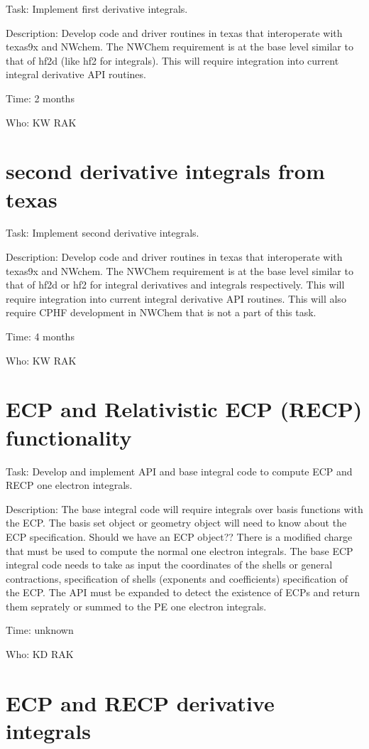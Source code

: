 Task: Implement first derivative integrals.

Description:  Develop code and driver routines in texas that
interoperate with texas9x and NWchem.  The NWChem requirement is at
the base level similar to that of hf2d (like hf2 for integrals).  This
will require integration into current integral derivative API routines.

Time: 2 months

Who: KW RAK


\section{second derivative integrals from texas}

Task: Implement second derivative integrals.

Description: Develop code and driver routines in texas that
interoperate with texas9x and NWchem.  The NWChem requirement is at
the base level similar to that of hf2d or hf2 for integral derivatives
and integrals respectively.  This will require integration into
current integral derivative API routines.  This will also require CPHF
development in NWChem that is not a part of this task.  

Time:  4 months

Who: KW RAK


\section{ECP and Relativistic ECP (RECP) functionality}

Task: Develop and implement API and base integral code to compute ECP
and RECP one electron integrals.

Description: The base integral code will require integrals over basis
functions with the ECP.  The basis set object or geometry object will
need to know about the ECP specification.  Should we have an ECP
object?? There is a modified charge that must be used to compute the
normal one electron integrals.  The base ECP integral code needs to
take as input the coordinates of the shells or general contractions,
specification of shells (exponents and coefficients) specification of
the ECP.  The API must be expanded to detect the existence of ECPs and
return them seprately or summed to the PE one electron integrals.  


Time: unknown

Who: KD RAK


\section{ECP and RECP derivative integrals}

